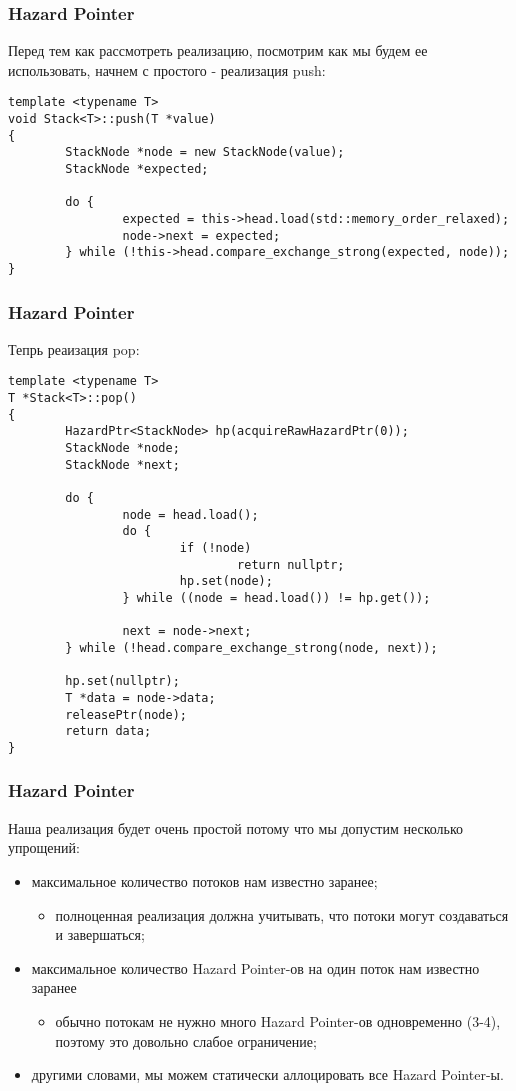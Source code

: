 \begin{frame}[fragile]
\frametitle{Hazard Pointer}

Перед тем как рассмотреть реализацию, посмотрим как мы будем ее использовать, начнем с простого - реализация push:

\begin{lstlisting}
template <typename T>
void Stack<T>::push(T *value)
{
        StackNode *node = new StackNode(value);
        StackNode *expected;

        do {
                expected = this->head.load(std::memory_order_relaxed);
                node->next = expected;
        } while (!this->head.compare_exchange_strong(expected, node));
}
\end{lstlisting}
\end{frame}

\begin{frame}[fragile]
\frametitle{Hazard Pointer}

Тепрь реаизация pop:
\begin{lstlisting}
template <typename T>
T *Stack<T>::pop()
{
        HazardPtr<StackNode> hp(acquireRawHazardPtr(0));
        StackNode *node;
        StackNode *next;

        do {
                node = head.load();
                do {
                        if (!node)
                                return nullptr;
                        hp.set(node);
                } while ((node = head.load()) != hp.get());

                next = node->next;
        } while (!head.compare_exchange_strong(node, next));

        hp.set(nullptr);
        T *data = node->data;
        releasePtr(node);
        return data;
}
\end{lstlisting}
\end{frame}

\begin{frame}
\frametitle{Hazard Pointer}
Наша реализация будет очень простой потому что мы допустим несколько упрощений:
\begin{itemize}
  \item максимальное количество потоков нам известно заранее;
    \begin{itemize}
      \item полноценная реализация должна учитывать, что потоки могут создаваться и завершаться;
    \end{itemize}
  \item максимальное количество Hazard Pointer-ов на один поток нам известно заранее
    \begin{itemize}
      \item обычно потокам не нужно много Hazard Pointer-ов одновременно (3-4), поэтому это довольно слабое ограничение;
    \end{itemize}
  \item другими словами, мы можем статически аллоцировать все Hazard Pointer-ы.
\end{itemize}
\end{frame}

